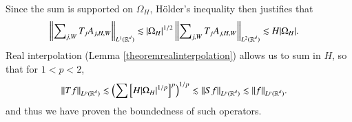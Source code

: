%
%
%
Since the sum is supported on $\Omega_H$, H\"{o}lder's inequality then justifies that
%
\begin{equation}
\begin{split}
  \left\| \sum\nolimits_{j,W} T_j A_{j,H,W} \right\|_{L^1(\operatorname{\mathbb{R}}^d)} &\lesssim |\Omega_H|^{1/2} \left\| \sum\nolimits_{j,W} T_j A_{j,H,W} \right\|_{L^2(\operatorname{\mathbb{R}}^d)} \lesssim H |\Omega_H|.
\end{split}
\end{equation}
%
Real interpolation (Lemma \ref{theoremrealinterpolation}) allows us to sum in $H$, so that for $1 < p < 2$,
%
\begin{equation}
\begin{split}
  \| Tf \|_{L^p(\operatorname{\mathbb{R}}^d)} &\lesssim \left( \sum \left[ H |\Omega_H|^{1/p} \right]^p \right)^{1/p} \lesssim \| S f \|_{L^p(\operatorname{\mathbb{R}}^d)} \lesssim \| f \|_{L^p(\operatorname{\mathbb{R}}^d)}.
\end{split}
\end{equation}
%
and thus we have proven the boundedness of such operators.

